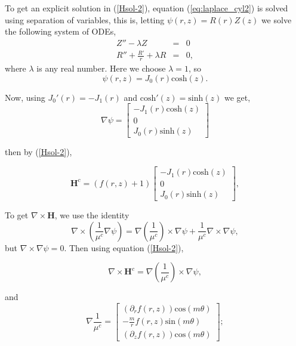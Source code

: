 \documentclass[11pt]{amsart}
\begin{document}
\noindent To get an explicit solution in (\ref{Hsol-2}),  equation (\ref{eq:laplace_cyl2}) is solved using separation of variables, this is, letting
$\psi(r,z)=R(r)Z(z)$ we solve the following system of ODEs,
\begin{eqnarray*}
Z''-\lambda Z & = & 0 \\
R''+\frac{R'}{r}+\lambda  R & = & 0,
\end{eqnarray*}
where $\lambda$ is any real number. Here we choose $\lambda=1$, so
\begin{equation}
\label{psi-sol2}
\psi(r,z)=J_0(r)\text{cosh}(z).
\end{equation}

\noindent Now, using $J_0'(r)=-J_1(r)$ and $\text{cosh}'(z)=\text{sinh}(z)$  we get,
\begin{equation}
\nabla \psi = \left[ \begin{array}{c} -J_1 (r)  \text{cosh}(z) \\ 0 \\J_0 (r)  \text{sinh}(z) \end{array} \right]
\end{equation}

\noindent then by (\ref{Hsol-2}), 

\begin{equation}
\mathbf{H}^c=(f(r,z)+1)
\left[ \begin{array}{c} -J_1 (r)  \text{cosh}(z) \\ 0 \\J_0 (r)  \text{sinh}(z) \end{array} \right],
\end{equation}

\noindent To get $\nabla \times \mathbf{H}$, we use the identity 
$$
\nabla \times \left (\frac{1}{{\mu}^c} \nabla \psi \right )= \nabla \left ( \frac{1}{{\mu}^c} \right ) \times  \nabla
\psi + \frac{1}{{\mu}^c} \nabla \times  \nabla \psi,
$$
but $\nabla \times  \nabla \psi = 0$. Then  using  equation (\ref{Hsol-2}), 

\begin{equation*}
\nabla \times \mathbf{H}^c=\nabla \left ( \frac{1}{{\mu}^c} \right ) \times  \nabla \psi, 
\end{equation*}

\noindent and 
\begin{equation}
 \nabla  \frac{1}{{\mu}^c}  =\left[ \begin{array}{c} (\partial _r f(r,z)) \text{cos} (m \theta)\\ - \frac{m}{r} f(r,z) \text{sin} (m \theta)  \\ (\partial _z f(r,z)) \text{cos} (m \theta) \end{array} \right];
\end{equation}
\end{document}
